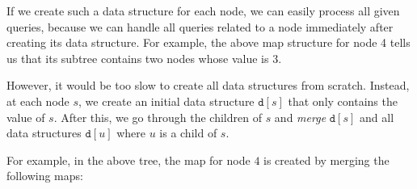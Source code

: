 \begin{center}
\end{center}

If we create such a data structure for each node,
we can easily process all given queries,
because we can handle all queries related
to a node immediately after creating its
data structure. For example, the above
map structure for node 4
tells us that its subtree
contains two nodes whose value is 3.

However, it would be too slow to create
all data structures from scratch.
Instead, at each node $s$,
we create an initial data structure $\texttt{d}[s]$ 
that only contains the value of $s$.
After this, we go through the children of $s$ and
\emph{merge} $\texttt{d}[s]$ and
all data structures
$\texttt{d}[u]$ where $u$ is a child of $s$.

For example, in the above tree, the map
for node $4$ is created by merging the following maps:

